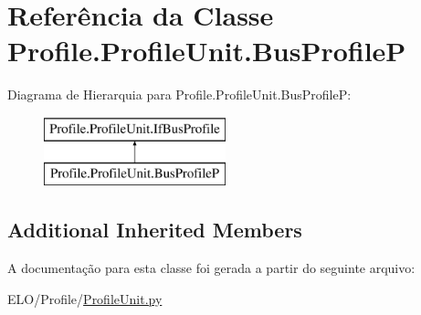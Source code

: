 \hypertarget{classProfile_1_1ProfileUnit_1_1BusProfileP}{\section{Referência da Classe Profile.\-Profile\-Unit.\-Bus\-Profile\-P}
\label{classProfile_1_1ProfileUnit_1_1BusProfileP}
}
Diagrama de Hierarquia para Profile.\-Profile\-Unit.\-Bus\-Profile\-P\-:\begin{figure}[H]
\begin{center}
\leavevmode
\includegraphics[height=2.000000cm]{d8/d9c/classProfile_1_1ProfileUnit_1_1BusProfileP}
\end{center}
\end{figure}
\subsection*{Additional Inherited Members}


A documentação para esta classe foi gerada a partir do seguinte arquivo\-:\begin{DoxyCompactItemize}
\item 
E\-L\-O/\-Profile/\hyperlink{ProfileUnit_8py}{Profile\-Unit.\-py}\end{DoxyCompactItemize}
